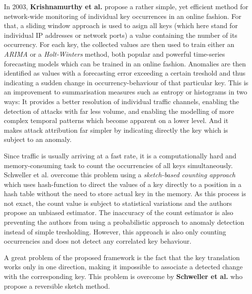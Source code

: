In 2003, \textbf{Krishnamurthy et al.} \cite{krishnamurthy2003sketch} propose a rather simple, yet efficient method for network-wide monitoring of individual key occurrences in an online fashion. For that, a sliding window approach is used to asign all keys (which here stand for individual IP addresses or network ports) a value containing the number of its occurrency. For each key, the collected values are then used to train either an \textit{ARIMA} or a \textit{Holt-Winters} method, both popular and powerful time-series forecasting models which can be trained in an online fashion. Anomalies are then identified as values with a forecasting error exceeding a certain treshold and thus indicating a sudden change in occurrency-behaviour of that particular key. This is an improvement to summarisation measures such as entropy or histograms in two ways: It provides a better resolution of individual traffic channels, enabling the detection of attacks with far less volume, and enabling the modelling of more complex temporal patterns which become apparent on a lower level. And it makes attack attribution far simpler by indicating directly the key which is subject to an anomaly. 

Since traffic is usually arriving at a fast rate, it is a computationally hard and memory-consuming task to count the occurrencies of all keys simultaneously. Schweller et al.  overcome this problem using a \textit{sketch-based counting approach} which uses hash-function to direct the values of a key directly to a position in a hash table without the need to store actual key in the memory. As this process is not exact, the count value is subject to statistical variations and the authors propose an unbiased estimator. The inaccuracy of the count estimator is also preventing the authors from using a probabilistic approach to anomaly detection instead of simple tresholding. However, this approach is also only counting occurrencies and does not detect any correlated key behaviour.

A great problem of the proposed framework is the fact that the key translation works only in one direction, making it impossible to associate a detected change with the corresponding key. This problem is overcome by \textbf{Schweller et al.} \cite{schweller2004reversible} who propose a reversible sketch method.

